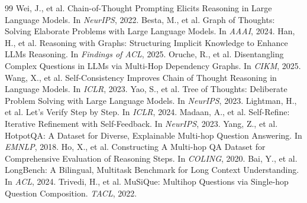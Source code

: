 \documentclass[11pt,a4paper]{article}
\begin{document}
\begin{thebibliography}{99}
 Wei, J., et al. Chain-of-Thought Prompting Elicits Reasoning in Large Language Models. In \emph{NeurIPS}, 2022.
 Besta, M., et al. Graph of Thoughts: Solving Elaborate Problems with Large Language Models. In \emph{AAAI}, 2024.
 Han, H., et al. Reasoning with Graphs: Structuring Implicit Knowledge to Enhance LLMs Reasoning. In \emph{Findings of ACL}, 2025.
 Oruche, R., et al. Disentangling Complex Questions in LLMs via Multi-Hop Dependency Graphs. In \emph{CIKM}, 2025.
 Wang, X., et al. Self-Consistency Improves Chain of Thought Reasoning in Language Models. In \emph{ICLR}, 2023.
 Yao, S., et al. Tree of Thoughts: Deliberate Problem Solving with Large Language Models. In \emph{NeurIPS}, 2023.
 Lightman, H., et al. Let's Verify Step by Step. In \emph{ICLR}, 2024.
 Madaan, A., et al. Self-Refine: Iterative Refinement with Self-Feedback. In \emph{NeurIPS}, 2023.
 Yang, Z., et al. HotpotQA: A Dataset for Diverse, Explainable Multi-hop Question Answering. In \emph{EMNLP}, 2018.
 Ho, X., et al. Constructing A Multi-hop QA Dataset for Comprehensive Evaluation of Reasoning Steps. In \emph{COLING}, 2020.
 Bai, Y., et al. LongBench: A Bilingual, Multitask Benchmark for Long Context Understanding. In \emph{ACL}, 2024.
 Trivedi, H., et al. MuSiQue: Multihop Questions via Single-hop Question Composition. \emph{TACL}, 2022.
\end{thebibliography}
\end{document}
